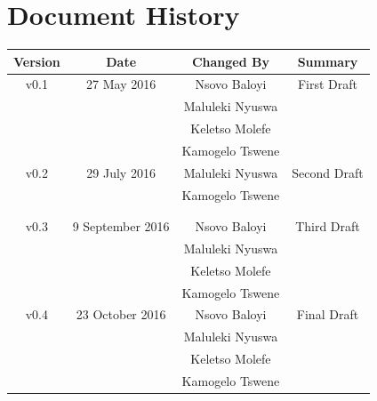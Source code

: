 \documentclass[a4paper,12pt]{article}
\begin{document}
	\newpage
	
	\tableofcontents
	\newpage
	
	\section*{Document History}
	
	\begin{table}[h!]
		
		\centering %
		\begin{tabular}{c c c c} %
			\hline\hline %
			Version & Date & Changed By & Summary \\ [0.5ex] %
			\hline %
			v0.1 & 27 May 2016 	& Nsovo Baloyi 		& First Draft 
			\\ & 				& Maluleki Nyuswa 	&  
			\\ & 				& Keletso Molefe 	&
			\\ & 				& Kamogelo Tswene 	& \\ [1ex] 
			\hline
			v0.2 & 29 July 2016 & Maluleki Nyuswa	& Second Draft
			\\ & 				& Kamogelo Tswene 	  
			\\ & 				& 	&
			\\ & 				&  	& \\ [1ex] 
			\hline %
			v0.3 & 9 September 2016 	& Nsovo Baloyi 		& Third Draft 
			\\ & 				& Maluleki Nyuswa 	&  
			\\ & 				& Keletso Molefe 	&
			\\ & 				& Kamogelo Tswene 	& \\ [1ex] 
			\hline %
			v0.4 & 23 October 2016 	& Nsovo Baloyi 		& Final Draft 
			\\ & 				& Maluleki Nyuswa 	&  
			\\ & 				& Keletso Molefe 	&
			\\ & 				& Kamogelo Tswene 	& \\ [1ex] 
			\hline\hline
		\end{tabular}
		\label{table:nonlin} %
	\end{table}
\end{document}

